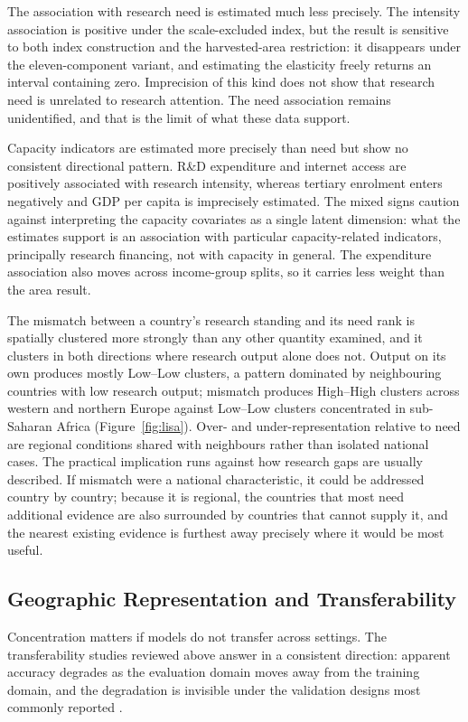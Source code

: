 \documentclass[ASNA,twocolumn]{USG}
\begin{document}
The association with research need is estimated much less precisely. The intensity association
is positive under the scale-excluded index, but the result is sensitive to both index
construction and the harvested-area restriction: it disappears under the eleven-component
variant, and estimating the elasticity freely returns an interval containing zero. Imprecision of
this kind does not show that research need is unrelated to research attention. The need
association remains unidentified, and that is the limit of what these data support.

Capacity indicators are estimated more precisely than need but show no consistent directional
pattern. R\&D
expenditure and internet access are positively associated with research intensity, whereas
tertiary enrolment enters negatively and GDP per capita is imprecisely estimated. The mixed
signs caution against interpreting the capacity covariates as a single latent dimension: what
the estimates support is an association with particular capacity-related indicators,
principally research financing, not with capacity in general. The expenditure association also moves across income-group splits, so it carries less weight
than the area result.

The mismatch between a country's research standing and its need rank is spatially clustered
more strongly than any other quantity examined, and it clusters in both directions where
research output alone does not. Output on its own produces mostly Low--Low clusters, a pattern dominated by neighbouring
countries with low research output; mismatch produces High--High clusters across western and
northern Europe against Low--Low clusters concentrated in sub-Saharan Africa
(Figure~\ref{fig:lisa}).
Over- and under-representation relative to need are regional conditions shared with neighbours
rather than isolated national cases. The practical implication runs against how research gaps are
usually described. If mismatch were a national characteristic, it could be addressed country by
country; because it is regional, the countries that most need additional evidence are also
surrounded by countries that cannot supply it, and the nearest existing evidence is furthest away
precisely where it would be most useful.

\subsection{Geographic Representation and Transferability}

Concentration matters if models do not transfer across settings. The transferability studies reviewed above answer in a consistent direction:
apparent accuracy degrades as the evaluation domain moves away from the training domain, and
the degradation is invisible under the validation designs most commonly reported
\cite{Habibi2024,Okupska2026,Stiller2024}.
\end{document}
